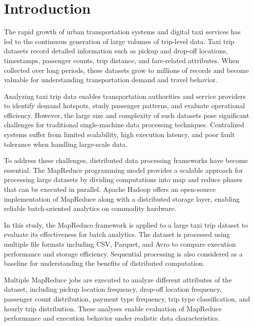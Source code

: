 \documentclass[12pt,a4paper]{report}
\begin{document}
\newpage
{}
\section{Introduction}

The rapid growth of urban transportation systems and digital taxi services has led to the
continuous generation of large volumes of trip-level data. Taxi trip datasets record
detailed information such as pickup and drop-off locations, timestamps, passenger
counts, trip distance, and fare-related attributes. When collected over long periods,
these datasets grow to millions of records and become valuable for understanding
transportation demand and travel behavior.

Analyzing taxi trip data enables transportation authorities and service providers to
identify demand hotspots, study passenger patterns, and evaluate operational
efficiency. However, the large size and complexity of such datasets pose significant
challenges for traditional single-machine data processing techniques. Centralized
systems suffer from limited scalability, high execution latency, and poor fault tolerance
when handling large-scale data.

To address these challenges, distributed data processing frameworks have become
essential. The MapReduce programming model provides a scalable approach for
processing large datasets by dividing computations into map and reduce phases that
can be executed in parallel. Apache Hadoop offers an open-source implementation of
MapReduce along with a distributed storage layer, enabling reliable batch-oriented
analytics on commodity hardware.

In this study, the MapReduce framework is applied to a large taxi trip dataset to evaluate
its effectiveness for batch analytics. The dataset is processed using multiple file formats
including CSV, Parquet, and Avro to compare execution performance and storage
efficiency. Sequential processing is also considered as a baseline for understanding the
benefits of distributed computation.

Multiple MapReduce jobs are executed to analyze different attributes of the dataset,
including pickup location frequency, drop-off location frequency, passenger count
distribution, payment type frequency, trip type classification, and hourly trip distribution.
These analyses enable evaluation of MapReduce performance and execution behavior
under realistic data characteristics.
\end{document}
